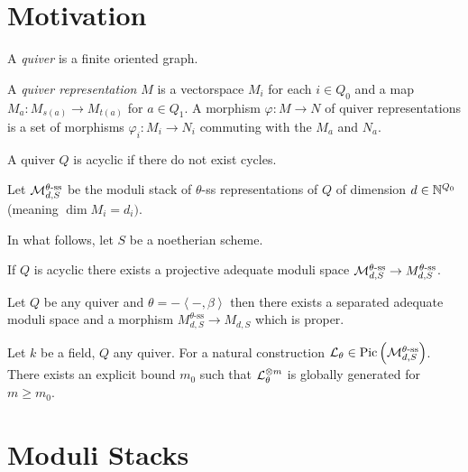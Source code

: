 \documentclass[12pt]{article}
\begin{document}
\section{Motivation}

\begin{defn}
A \textit{quiver} is a finite oriented graph.
\end{defn}

\begin{defn}
A \textit{quiver representation} $M$ is a vectorspace $M_i$ for each $i \in Q_0$ and a map $M_a : M_{s(a)} \to M_{t(a)}$ for $a \in Q_1$. A morphism $\varphi : M \to N$ of quiver representations is a set of morphisms $\varphi_i : M_i \to N_i$ commuting with the $M_a$ and $N_a$.
\end{defn}

\begin{defn}
A quiver $Q$ is acyclic if there do not exist cycles.
\end{defn}

\begin{defn}
Let $\mathcal{M}_{d,S}^{\theta\text{-ss}}$ be the moduli stack of $\theta$-ss representations of $Q$ of dimension $d \in \mathbb{N}^{Q_0}$ (meaning $\dim{M_i} = d_i)$.
\end{defn}

In what follows, let $S$ be a noetherian scheme.

\begin{theorem}
If $Q$ is acyclic there exists a projective adequate moduli space $\mathcal{M}_{d,S}^{\theta\text{-ss}} \to M_{d,S}^{\theta\text{-ss}}$.
\end{theorem}

\begin{theorem}
Let $Q$ be any quiver and $\theta = - \left< -, \beta \right>$ then there exists a separated adequate moduli space and a morphism $M^{\theta\text{-ss}}_{d,S} \to M_{d,S}$ which is proper.
\end{theorem}

\begin{theorem}
Let $k$ be a field, $Q$ any quiver. For a natural construction $\mathcal{L}_{\theta} \in \mathrm{Pic} \left( \mathcal{M}_{d,S}^{\theta\text{-ss}} \right)$. There exists an explicit bound $m_0$ such that $\mathcal{L}_\theta^{\otimes m}$ is globally generated for $m \ge m_0$.
\end{theorem}

\section{Moduli Stacks}
\end{document}
